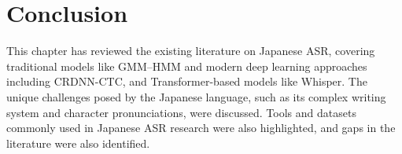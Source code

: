 \section{Conclusion}
This chapter has reviewed the existing literature on Japanese ASR, covering traditional models like GMM--HMM and modern deep learning approaches including CRDNN-CTC, and Transformer-based models like Whisper. The unique challenges posed by the Japanese language, such as its complex writing system and character pronunciations, were discussed. Tools and datasets commonly used in Japanese ASR research were also highlighted, and gaps in the literature were also identified.
